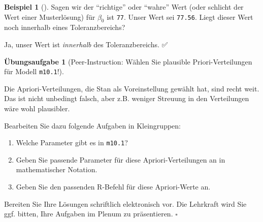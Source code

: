 \documentclass[
  ngerman,
  letterpaper,
  twoside,
  open=any]{scrbook}
\newenvironment{Shaded}{\begin{snugshade}}{\end{snugshade}}
\newcommand{\AttributeTok}[1]{\textcolor[rgb]{0.40,0.45,0.13}{#1}}
\newcommand{\CommentTok}[1]{\textcolor[rgb]{0.37,0.37,0.37}{#1}}
\newcommand{\DecValTok}[1]{\textcolor[rgb]{0.68,0.00,0.00}{#1}}
\newcommand{\DocumentationTok}[1]{\textcolor[rgb]{0.37,0.37,0.37}{\textit{#1}}}
\newcommand{\FloatTok}[1]{\textcolor[rgb]{0.68,0.00,0.00}{#1}}
\newcommand{\FunctionTok}[1]{\textcolor[rgb]{0.28,0.35,0.67}{#1}}
\newcommand{\NormalTok}[1]{\textcolor[rgb]{0.00,0.23,0.31}{#1}}
\newcommand{\SpecialCharTok}[1]{\textcolor[rgb]{0.37,0.37,0.37}{#1}}
\providecommand{\tightlist}{%
  \setlength{\itemsep}{0pt}\setlength{\parskip}{0pt}}\usepackage{longtable,booktabs,array}
\theoremstyle{definition}
\newtheorem{example}{Beispiel}[chapter]
\theoremstyle{plain}
\theoremstyle{definition}
\newtheorem{exercise}{Übungsaufgabe}[chapter]
\theoremstyle{definition}
\theoremstyle{remark}
\begin{document}
\begin{example}[]
Sagen wir der \enquote{richtige} oder \enquote{wahre} Wert (oder
schlicht der Wert einer Musterlösung) für \(\beta_0\) ist \texttt{77}.
Unser Wert sei \texttt{77.56}. Liegt dieser Wert noch innerhalb eines
Toleranzbereichs?

\begin{Shaded}
\end{Shaded}

Ja, unser Wert ist \emph{innerhalb} des Toleranzbereichs. ✅

\begin{exercise}[Peer-Instruction: Wählen Sie plausible
Priori-Verteilungen für Modell
\texttt{m10.1}!]\protect\hypertarget{exr-peer-m10.1-priors}{}\label{exr-peer-m10.1-priors}

Die Apriori-Verteilungen, die Stan als Voreinstellung gewählt hat, sind
recht weit. Das ist nicht unbedingt falsch, aber z.B. weniger Streuung
in den Verteilungen wäre wohl plausibler.

Bearbeiten Sie dazu folgende Aufgaben in Kleingruppen:

\begin{enumerate}
\def\labelenumi{\alph{enumi})}
\tightlist
\item
  Welche Parameter gibt es in \texttt{m10.1}?
\item
  Geben Sie passende Parameter für diese Apriori-Verteilungen an in
  mathematischer Notation.
\item
  Geben Sie den passenden R-Befehl für diese Apriori-Werte an.
\end{enumerate}

Bereiten Sie Ihre Lösungen schriftlich elektronisch vor. Die Lehrkraft
wird Sie ggf. bitten, Ihre Aufgaben im Plenum zu präsentieren.
\(\square\)

\end{exercise}


\end{example}
\end{document}
